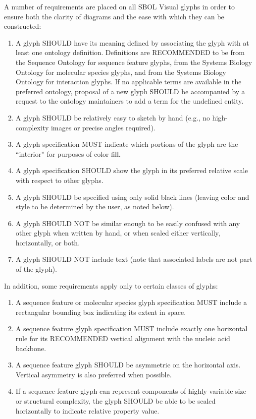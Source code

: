 A number of requirements are placed on all SBOL Visual glyphs in order to
ensure both the clarity of diagrams and the ease with which they can
be constructed:
\begin{enumerate}
\item A glyph SHOULD have its meaning defined by associating the glyph with at least one ontology definition.
	Definitions are RECOMMENDED to be from the Sequence Ontology for sequence feature glyphs, from the Systems Biology Ontology for molecular species glyphs, and from the Systems Biology Ontology for interaction glyphs.  
	If no applicable terms are available in the preferred ontology, proposal of a new glyph SHOULD be accompanied by a request to the ontology maintainers to add a term for the undefined entity.  
\item A glyph SHOULD be relatively easy to sketch by hand (e.g., no high-complexity images or precise angles required).
\item A glyph specification MUST indicate which portions of the glyph are the ``interior'' for purposes of color fill.
\item A glyph specification SHOULD show the glyph in its preferred relative scale with respect to other glyphs.
\item A glyph SHOULD be specified using only solid black lines (leaving color and style to be determined by the user, as noted below).
\item A glyph SHOULD NOT be similar enough to be easily confused with any other glyph when written by hand, or when scaled either vertically, horizontally, or both.
\item A glyph SHOULD NOT include text (note that associated labels are not part of the glyph).
\end{enumerate}

In addition, some requirements apply only to certain classes of glyphs:
\begin{enumerate}[resume]
\item A sequence feature or molecular species glyph specification MUST include a rectangular bounding box indicating its extent in space.
\item A sequence feature glyph specification MUST include exactly one horizontal rule for its RECOMMENDED vertical alignment with the nucleic acid backbone.
\item A sequence feature glyph SHOULD be asymmetric on the horizontal axis. Vertical asymmetry is also preferred when possible.
\item If a sequence feature glyph can represent components of highly variable size or structural complexity, the glyph SHOULD be able to be scaled horizontally to indicate relative property value.
\end{enumerate}

